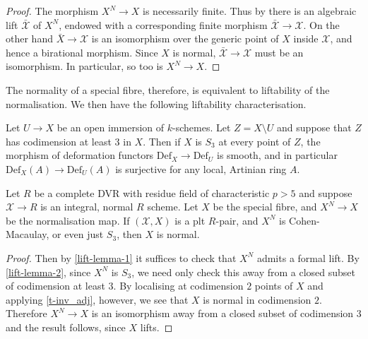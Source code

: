 \begin{proof}
	The morphism $X^{N} \to X$ is necessarily finite. Thus by \cite[Tag 09ZT]{stacks-project} there is an algebraic lift $\bar{\mathcal{X}}$ of $X^{N}$, endowed with a corresponding finite morphism $\bar{\mathcal{X}} \to \mathcal{X}$. On the other hand $\bar{X} \to \mathcal{X}$ is an isomorphism over the generic point of $X$ inside $\mathcal{X}$, and hence a birational morphism. Since $X$ is normal, $\bar{\mathcal{X}}\to \mathcal{X}$ must be an isomorphism. In particular, so too is $X^{N} \to X$.
\end{proof}

The normality of a special fibre, therefore, is equivalent to liftability of the normalisation. We then have the following liftability characterisation.

\begin{lemma}\cite[Lemma A.23]{zdanowicz2018liftability}\label{lift-lemma-2}
	
	Let $U \to X$ be an open immersion of $k$-schemes. Let $Z=X \setminus U$ and suppose that $Z$ has codimension at least $3$ in $X$. Then if $X$ is $S_{3}$ at every point of $Z$, the morphism of deformation functors $\text{Def}_{X} \to \text{Def}_{U}$ is smooth, and in particular $\text{Def}_{X}(A) \to \text{Def}_{U}(A)$ is surjective for any local, Artinian ring $A$.  
	
	\end{lemma}

\begin{lemma}\label{adj1}
	
	Let $R$ be a complete DVR with residue field of characteristic $p > 5$ and suppose $\mathcal{X} \to R$ is an integral, normal $R$ scheme. Let $X$ be the special fibre, and $X^{N} \to X$ be the normalisation map. If $(\mathcal{X},X)$ is a plt $R$-pair, and $X^{N}$ is Cohen-Macaulay, or even just $S_{3}$, then $X$ is normal.
	
\end{lemma}

\begin{proof}

	Then by \autoref{lift-lemma-1} it suffices to check that $X^{N}$ admits a formal lift. By \autoref{lift-lemma-2}, since $X^{N}$ is $S_{3}$, we need only check this away from a closed subset of codimension at least $3$. By localising at codimension $2$ points of $X$ and applying \autoref{t-inv_adj}, however, we see that $X$ is normal in codimension $2$. Therefore $X^{N} \to X$ is an isomorphism away from a closed subset of codimension $3$ and the result follows, since $X$ lifts.
	
\end{proof}

